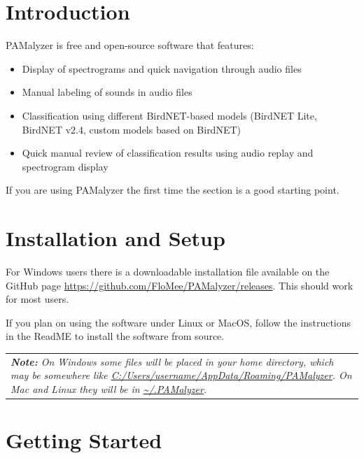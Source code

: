 \documentclass{scrartcl}
\begin{document}
\tableofcontents
\newpage
\section{Introduction}

PAMalyzer is free and open-source software that features: 
\begin{itemize}

	\item Display of spectrograms and quick navigation through audio files
	\item Manual labeling of sounds in audio files 
	\item Classification using different BirdNET-based models (BirdNET Lite, BirdNET v2.4, custom models based on BirdNET)
	\item Quick manual review of classification results using audio replay and spectrogram display

\end{itemize}
If you are using PAMalyzer the first time the section  is a good starting point. 


\section{Installation and Setup}

For Windows users there is a downloadable installation file available on the GitHub page \url{https://github.com/FloMee/PAMalyzer/releases}.
This should work for most users.

If you plan on using the software under Linux or MacOS, follow the instructions in the ReadME to install the software from source.

\begin{table}[ht!]
	\centering
	\begin{tabular}{p{}}
		\textit{\textbf{Note:} On Windows some files will be placed in your home directory, which may be somewhere like \url{C:/Users/username/AppData/Roaming/PAMalyzer}. On Mac and Linux they will be in \url{~/.PAMalyzer}.}
	\end{tabular}
\end{table}

\section{Getting Started}
\label{sec:GettingStarted}
\end{document}
